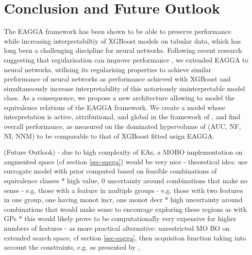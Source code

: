 \documentclass[twoside,11pt]{article}
\begin{document}

\section{Conclusion and Future Outlook}
The EAGGA framework has been shown to be able to preserve performance while increasing interpretabiltiy of XGBoost models on tabular data, which has long been 
a challenging discipline for neural networks. Following recent research suggesting that regularisation can improve
performance \citep[8]{NEURIPS2021_c902b497}, we extended EAGGA \citep{EAGGA} to neural networks, utilising its regularising properties to achieve similar
performance of neural networks as performance achieved with XGBoost and simultaneously increase interpretability of this notoriously uninterpretable model class.
As a consequence, we propose a new architecture allowing to model the equivalence relations of the EAGGA framework.
We create a model whose interpretation is active, attributional, and global in the framework of \citet[chap. 2]{survey_NN_interpretability}, and find
overall performance, as measured on the dominated hypervolume of (AUC, NF, NI, NNM) to be comparable to that of XGBoost fitted usign EAGGA.

(Future Outlook)
- due to high complexity of EAs, a MOBO implementation on augmented space (cf section \ref{sec-eagga}) would be very nice
- theoretical idea: use surrogate model with prior computed based on feasible combinations of equivalence classes
  * high value, 0 uncertainty around combinations that make no sense
    - e.g. those with a feature in multiple groups
    - e.g. those with two features in one group, one having monot incr, one monot decr
  * high uncertainty around combinations that would make sense to encourage exploring these regions as with GPs
  * this would likely prove to be computationally very expensive for higher numbers of features
- as more practical alternative: unrestricted MO BO on extended search space, cf section \ref{sec-eagga}, then acquisiton function taking into
  account the constraints, e.g. as presented by \citep{10.5555/3020751.3020778}, \citep{perrone2019constrainedbayesianoptimizationmaxvalue}
\end{document}
